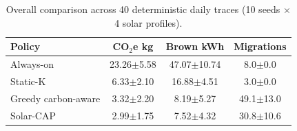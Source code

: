 \begin{table}[t]
\centering
\caption{Overall comparison across 40 deterministic daily traces (10 seeds $\times$ 4 solar profiles).}
\label{tab:overall_results}
\begin{tabular}{lccc}
\toprule
\textbf{Policy} & \textbf{CO$_2$e kg} & \textbf{Brown kWh} & \textbf{Migrations} \\
\midrule
Always-on & 23.26$\pm$5.58 & 47.07$\pm$10.74 & 8.0$\pm$0.0 \\
Static-K & 6.33$\pm$2.10 & 16.88$\pm$4.51 & 3.0$\pm$0.0 \\
Greedy carbon-aware & 3.32$\pm$2.20 & 8.19$\pm$5.27 & 49.1$\pm$13.0 \\
Solar-CAP & 2.99$\pm$1.75 & 7.52$\pm$4.32 & 30.8$\pm$10.6 \\
\bottomrule
\end{tabular}
\end{table}
